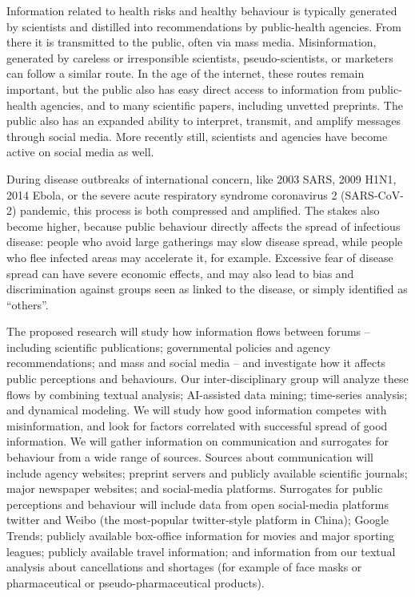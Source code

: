 


Information related to health risks and healthy behaviour is typically generated by scientists and distilled into recommendations by public-health agencies. From there it is transmitted to the public, often via mass media. Misinformation, generated by careless or irresponsible scientists, pseudo-scientists, or marketers can follow a similar route. In the age of the internet, these routes remain important, but the public also has easy direct access to information from public-health agencies, and to many scientific papers, including unvetted preprints. The public also has an expanded ability to interpret, transmit, and amplify messages through social media. More recently still, scientists and agencies have become active on social media as well.

During disease outbreaks of international concern, like 2003 SARS, 2009 H1N1, 2014 Ebola, or the severe acute respiratory syndrome coronavirus 2 (SARS-CoV-2) pandemic, this process is both compressed and amplified. The stakes also become higher, because public behaviour directly affects the spread of infectious disease: people who avoid large gatherings may slow disease spread, while people who flee infected areas may accelerate it, for example. Excessive fear of disease spread can have severe economic effects, and may also lead to bias and discrimination against groups seen as linked to the disease, or simply identified as ``others''. 

The proposed research will study how information flows between forums -- including scientific publications; governmental policies and agency recommendations; and mass and social media -- and investigate how it affects public perceptions and behaviours. 
Our inter-disciplinary group will analyze these flows by combining textual analysis; AI-assisted data mining; time-series analysis; and dynamical modeling. We will study how good information competes with misinformation, and look for factors correlated with successful spread of good information. 
We will gather information on communication and surrogates for behaviour from a wide range of sources. 
Sources about communication will include agency websites; preprint servers and publicly available scientific journals; major newspaper websites; and social-media platforms. 
Surrogates for public perceptions and behaviour will include data from open social-media platforms twitter and Weibo (the most-popular twitter-style platform in China); Google Trends; publicly available box-office information for movies and major sporting leagues; publicly available travel information; and information  from our textual analysis about cancellations and shortages (for example of face masks or pharmaceutical or pseudo-pharmaceutical products). 

